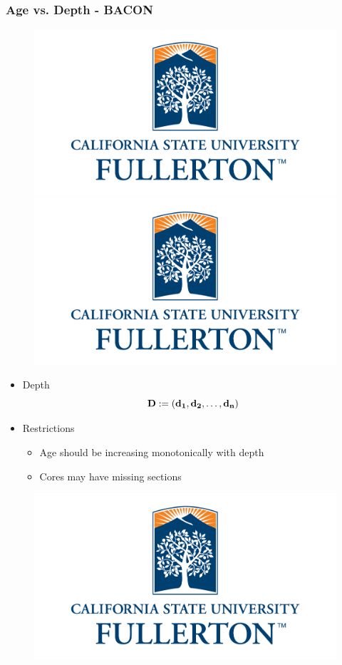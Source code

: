 \documentclass{beamer}
\begin{document}
\begin{frame}
\frametitle{Age vs. Depth - BACON}
{\begin{figure}
\hspace*{-.2in}
\includegraphics[width=.5\linewidth]{CSUFlogo.png}
\includegraphics[width=.5\linewidth]{CSUFlogo.png}
\end{figure}}

{\begin{itemize}
	\item<1-> Depth $$ \bf D:=(d_1, d_2, \ldots, d_n)$$
	\item<2-> Restrictions
	\begin{itemize}
		\item Age should be increasing monotonically with depth
		\item Cores may have missing sections
	\end{itemize}
  \end{itemize}
  
}

{\begin{figure}
\hspace*{-.2in}
\includegraphics[width=0.8\linewidth]{CSUFlogo.png}
\end{figure}}


\end{frame}
\end{document}
